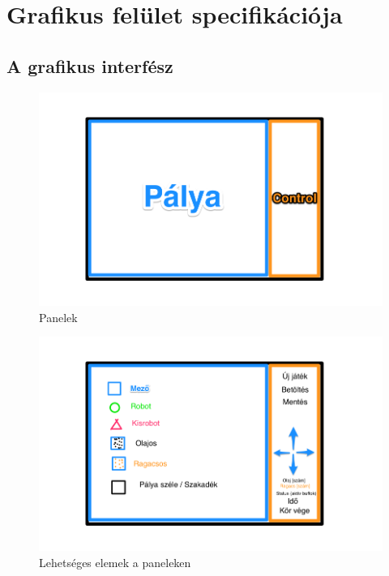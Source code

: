 %
\chapter{Grafikus felület specifikációja}

\thispagestyle{fancy}

\section{A grafikus interfész}

\begin{figure}[h!]
\begin{center}
\includegraphics[width=17cm]{chapters/chapter11/1.png}
\caption{Panelek}
\label{fig:Grafikus1}
\end{center}
\end{figure}

\clearpage

\begin{figure}[h!]
\begin{center}
\includegraphics[width=17cm]{chapters/chapter11/2.png}
\caption{Lehetséges elemek a paneleken}
\label{fig:Grafikus2}
\end{center}
\end{figure}

